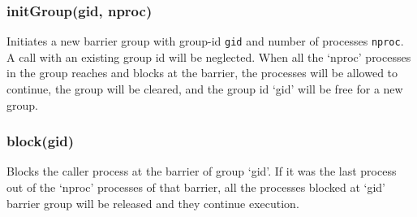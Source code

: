 \subsubsection{initGroup(gid, nproc)}
Initiates a new barrier group with group-id \texttt{gid} and number of processes \texttt{nproc}. A call with an existing group id will be neglected. When all the `nproc' processes in the group reaches and blocks at the barrier, the processes will be allowed to continue, the group will be cleared, and the group id `gid' will be free for a new group.
\subsubsection{block(gid)}
Blocks the caller process at the barrier of group `gid'. If it was the last process out of the `nproc' processes of that barrier, all the processes blocked at `gid' barrier group will be released and they continue execution.
